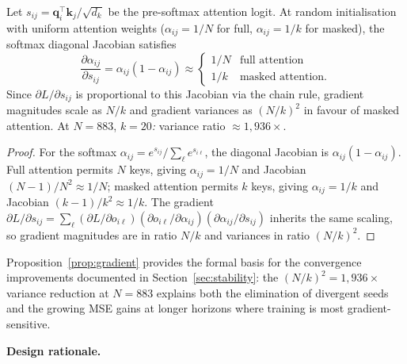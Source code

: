 \begin{proposition}
\label{prop:gradient}
Let $s_{ij} = \mathbf{q}_i^\top\mathbf{k}_j/\sqrt{d_k}$ be the pre-softmax attention
logit.
At random initialisation with uniform attention weights
($\alpha_{ij}{=}1/N$ for full, $\alpha_{ij}{=}1/k$ for masked), the softmax
diagonal Jacobian satisfies
\begin{equation}
\frac{\partial\alpha_{ij}}{\partial s_{ij}}
  = \alpha_{ij}(1-\alpha_{ij})
  \approx
  \begin{cases}
    1/N & \text{full attention}\\
    1/k & \text{masked attention.}
  \end{cases}
  \label{eq:jacobian}
\end{equation}
Since $\partial L/\partial s_{ij}$ is proportional to this Jacobian via the chain
rule, gradient magnitudes scale as $N/k$ and gradient variances as $(N/k)^2$
in favour of masked attention.
At $N{=}883$, $k{=}20$\emph{:} variance ratio ${\approx}1{,}936\times$.
\end{proposition}
\begin{proof}
For the softmax $\alpha_{ij}=e^{s_{ij}}/\sum_\ell e^{s_{i\ell}}$, the diagonal
Jacobian is $\alpha_{ij}(1{-}\alpha_{ij})$.
Full attention permits $N$ keys, giving $\alpha_{ij}{=}1/N$ and Jacobian
$(N{-}1)/N^2\approx1/N$; masked attention permits $k$ keys, giving $\alpha_{ij}{=}1/k$
and Jacobian $(k{-}1)/k^2\approx1/k$.
The gradient $\partial L/\partial s_{ij}=\sum_\ell(\partial L/\partial o_{i\ell})
(\partial o_{i\ell}/\partial\alpha_{ij})(\partial\alpha_{ij}/\partial s_{ij})$
inherits the same scaling, so gradient magnitudes are in ratio $N/k$
and variances in ratio $(N/k)^2$.
\end{proof}
Proposition~\ref{prop:gradient} provides the formal basis for the convergence
improvements documented in Section~\ref{sec:stability}: the $(N/k)^2{=}1{,}936\times$
variance reduction at $N{=}883$ explains both the elimination of divergent seeds
and the growing MSE gains at longer horizons where training is most gradient-sensitive.

\textbf{Design rationale.}
\label{sec:design}

